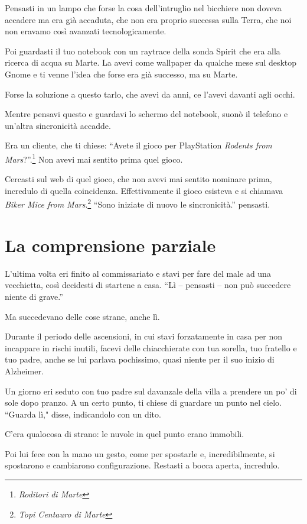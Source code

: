Pensasti in un lampo che forse la cosa dell'intruglio nel bicchiere non doveva accadere ma era già accaduta, che non era proprio successa sulla Terra, che noi non eravamo così avanzati tecnologicamente.

Poi guardasti il tuo notebook con un raytrace della sonda Spirit che era alla ricerca di acqua su Marte. La avevi come wallpaper da qualche mese sul desktop Gnome e ti venne l'idea che forse era già successo, ma su Marte.

Forse la soluzione a questo tarlo, che avevi da anni, ce l'avevi davanti agli occhi.

Mentre pensavi questo e guardavi lo schermo del notebook, suonò il telefono e un'altra sincronicità accadde.

Era un cliente, che ti chiese: “Avete il gioco per PlayStation \textit{Rodents from Mars}?''.\footnote{\textit{Roditori di Marte}} Non avevi mai sentito prima quel gioco.

Cercasti sul web di quel gioco, che non avevi mai sentito nominare prima, incredulo di quella coincidenza. Effettivamente il gioco esisteva e si chiamava \textit{Biker Mice from Mars}.\footnote{\textit{Topi Centauro di Marte}} “Sono iniziate di nuovo le sincronicità.” pensasti.

\section{La comprensione parziale}
\label{comprensione_parziale}

L'ultima volta eri finito al commissariato e stavi per fare del male ad una vecchietta, così decidesti di startene a casa. “Lì -- pensasti -- non può succedere niente di grave.”

Ma succedevano delle cose strane, anche lì.

Durante il periodo delle ascensioni, in cui stavi forzatamente in casa per non incappare in rischi inutili, facevi delle chiacchierate con tua sorella, tuo fratello e tuo padre, anche se lui parlava pochissimo, quasi niente per il suo inizio di Alzheimer.

Un giorno eri seduto con tuo padre sul davanzale della villa a prendere un po' di sole dopo pranzo. A un certo punto, ti chiese di guardare un punto nel cielo. “Guarda lì," disse, indicandolo con un dito.

C'era qualocosa di strano: le nuvole in quel punto erano immobili.

Poi lui fece con la mano un gesto, come per spostarle e, incredibilmente, si spostarono e cambiarono configurazione. Restasti a bocca aperta, incredulo.

